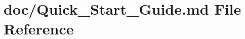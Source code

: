 \hypertarget{Quick__Start__Guide_8md}{\section{doc/\-Quick\-\_\-\-Start\-\_\-\-Guide.md File Reference}
\label{Quick__Start__Guide_8md}
}
